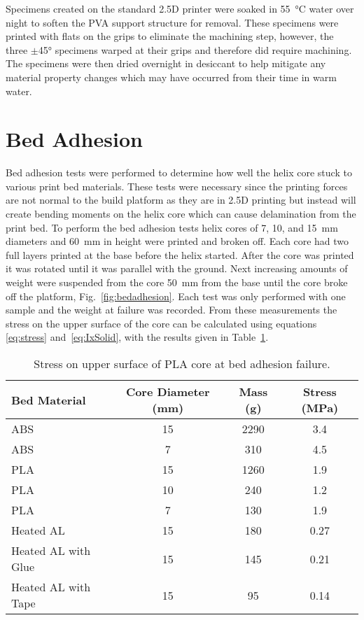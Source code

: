 \documentclass[main.tex]{subfiles}
\begin{document}
Specimens created on the standard 2.5D printer were soaked in \SI{55}{\degreeCelsius} water over night to soften the PVA support structure for removal.
These specimens were printed with flats on the grips to eliminate the machining step, however, the three $\pm$\ang{45} specimens warped at their grips and therefore did require machining.
The specimens were then dried overnight in desiccant to help mitigate any material property changes which may have occurred from their time in warm water.

\section{Bed Adhesion}
\label{sec:bedadhesion}
Bed adhesion tests were performed to determine how well the helix core stuck to various print bed materials.
These tests were necessary since the printing forces are not normal to the build platform as they are in 2.5D printing but instead will create bending moments on the helix core which can cause delamination from the print bed.
To perform the bed adhesion tests helix cores of 7, 10, and \SI{15}{mm} diameters and \SI{60}{mm} in height were printed and broken off.
Each core had two full layers printed at the base before the helix started.
After the core was printed it was rotated until it was parallel with the ground.
Next increasing amounts of weight were suspended from the core \SI{50}{mm} from the base until the core broke off the platform, Fig.~\ref{fig:bedadhesion}.
Each test was only performed with one sample and the weight at failure was recorded.
From these measurements the stress on the upper surface of the core can be calculated using equations \ref{eq:stress} and~\ref{eq:IxSolid}, with the results given in Table~\ref{tab:bedadhesion}.

\begin{table}
\caption{Stress on upper surface of PLA core at bed adhesion failure.}
\centering
\begin{tabular}{l c c c}
	\textbf{Bed Material} & \textbf{Core Diameter} (\si{mm}) &
		\textbf{Mass} (\si{g}) & \textbf{Stress} (\si{\mega\pascal}) \\
	\toprule
	ABS & 15 & 2290 & 3.4 \\
	ABS & 7 & 310 & 4.5 \\
	\midrule
	PLA & 15 & 1260 & 1.9 \\
	PLA & 10 & 240 & 1.2 \\
	PLA & 7 & 130 & 1.9 \\
	\midrule
	Heated AL & 15 & 180 &  0.27 \\
	Heated AL with Glue & 15 & 145 & 0.21 \\
	Heated AL with Tape & 15 & 95 & 0.14 \\
	\bottomrule
\end{tabular}
	\label{tab:bedadhesion}
\end{table}
\end{document}
